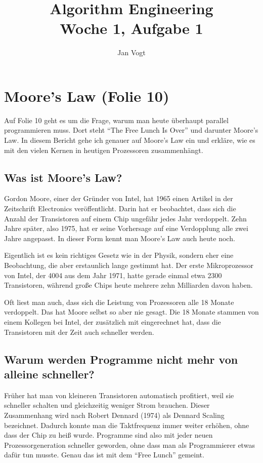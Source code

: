 \documentclass[11pt]{article}
\title{Algorithm Engineering\\Woche 1, Aufgabe 1}
\author{Jan Vogt}
\date{}
\begin{document}
\maketitle

\section*{Moore's Law (Folie 10)}

Auf Folie 10 geht es um die Frage, warum man heute überhaupt parallel programmieren muss. Dort
steht "`The Free Lunch Is Over"' und darunter Moore's Law. In diesem Bericht gehe ich genauer auf
Moore's Law ein und erkläre, wie es mit den vielen Kernen in heutigen Prozessoren zusammenhängt.

\subsection*{Was ist Moore's Law?}

Gordon Moore, einer der Gründer von Intel, hat 1965 einen Artikel in der Zeitschrift Electronics
veröffentlicht. Darin hat er beobachtet, dass sich die Anzahl der Transistoren auf einem Chip
ungefähr jedes Jahr verdoppelt. Zehn Jahre später, also 1975, hat er seine Vorhersage auf eine
Verdopplung alle zwei Jahre angepasst. In dieser Form kennt man Moore's Law auch heute noch.

Eigentlich ist es kein richtiges Gesetz wie in der Physik, sondern eher eine Beobachtung, die
aber erstaunlich lange gestimmt hat. Der erste Mikroprozessor von Intel, der 4004 aus dem Jahr
1971, hatte gerade einmal etwa 2300 Transistoren, während große Chips heute mehrere zehn
Milliarden davon haben.

Oft liest man auch, dass sich die Leistung von Prozessoren alle 18 Monate verdoppelt. Das hat
Moore selbst so aber nie gesagt. Die 18 Monate stammen von einem Kollegen bei Intel, der
zusätzlich mit eingerechnet hat, dass die Transistoren mit der Zeit auch schneller werden.

\subsection*{Warum werden Programme nicht mehr von alleine schneller?}

Früher hat man von kleineren Transistoren automatisch profitiert, weil sie schneller schalten
und gleichzeitig weniger Strom brauchen. Dieser Zusammenhang wird nach Robert Dennard (1974) als
Dennard Scaling bezeichnet. Dadurch konnte man die Taktfrequenz immer weiter erhöhen, ohne dass
der Chip zu heiß wurde. Programme sind also mit jeder neuen Prozessorgeneration schneller
geworden, ohne dass man als Programmierer etwas dafür tun musste. Genau das ist mit dem
"`Free Lunch"' gemeint.
\end{document}
